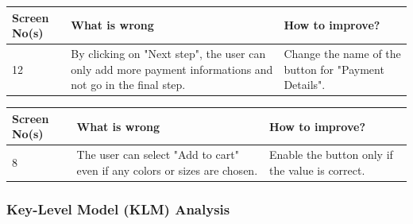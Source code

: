 \begin{table}[htdp]
\begin{center}
\begin{tabular}{|p{2cm}|p{6.5cm}|p{6.5cm}|}
\hline
\textbf{Screen No(s)} & \textbf{What is wrong} & \textbf{How to improve?} \\
\hline
12 & By clicking on "Next step", the user can only add more payment informations and not go in the final step. & Change the name of the button for "Payment Details".\\
\hline
\end{tabular}
\end{center}
\label{4_heurisitcs_eval}
\end{table}

\begin{table}[htdp]
\begin{center}
\begin{tabular}{|p{2cm}|p{6.5cm}|p{6.5cm}|}
\hline
\textbf{Screen No(s)} & \textbf{What is wrong} & \textbf{How to improve?} \\
\hline
8 & The user can select "Add to cart" even if any colors or sizes are chosen. & Enable the button only if the value is correct.\\
\hline
\end{tabular}
\end{center}
\label{5_heurisitcs_eval}
\end{table}






\subsubsection{Key-Level Model (KLM) Analysis}\label{sec:klm}


